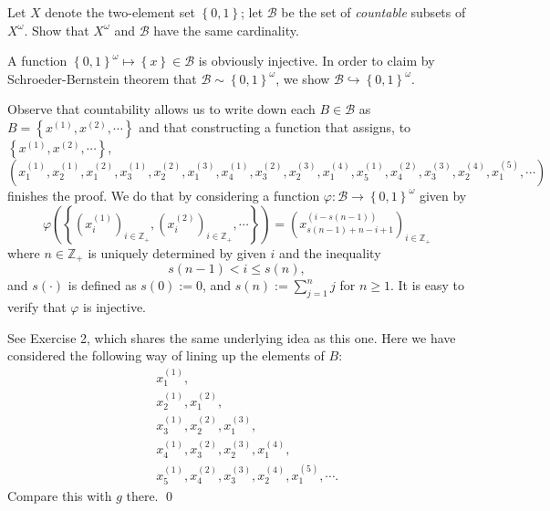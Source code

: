\documentclass[a4paper,12pt]{article}
\begin{document}
\begin{exe}
	Let \( X \) denote the two-element set \( \left\{ 0,1 \right\} \);
	let \( \mathcal{B} \) be the set of \textit{countable} subsets of \( X^{\omega} \).
	Show that \( X^{\omega} \) and \( \mathcal{B} \) have the same cardinality.
\end{exe}\begin{sol}
	A function
	\( \left\{ 0,1 \right\}^{\omega} \mapsto \left\{ x \right\} \in \mathcal{B}\)
	is obviously injective.
	In order to claim by Schroeder-Bernstein theorem that
	\( \mathcal{B} \sim \left\{ 0,1 \right\}^{\omega} \),
	we show \( \mathcal{B} \hookrightarrow \left\{ 0,1 \right\}^{\omega}\). 
	
	Observe that countability allows us to write down each 
	\( B \in \mathcal{B} \) as
	\( B=\left\{ x^{(1)}, x^{(2)},\cdots \right\} \)
	and that constructing a function that assigns, to 
	\( \left\{ x^{(1)}, x^{(2)},\cdots \right\} \),
	\begin{equation*}
		\left(
		x^{(1)}_1,
		x^{(1)}_2,x^{(2)}_1,
		x^{(1)}_3,x^{(2)}_2,x^{(3)}_1,
		x^{(1)}_4,x^{(2)}_3,x^{(3)}_2,x^{(4)}_1,
		x^{(1)}_5,x^{(2)}_4,x^{(3)}_3,x^{(4)}_2,x^{(5)}_1,\cdots
		\right)
	\end{equation*}
	finishes the proof.
	We do that by considering a function
	\( \varphi : \mathcal{B} \to \left\{ 0,1 \right\}^{\omega} \)
	given by
	\begin{equation*}
		\varphi
		\left( \left\{ \left( x^{(1)}_i \right)_{i \in \mathbb{Z}_{+}},
		\left( x^{(2)}_i \right)_{i \in \mathbb{Z}_{+}},\cdots \right\} \right)
		=
		\left( x^{(i - s(n-1))}_{s(n-1)+n-i+1} \right)_{i \in \mathbb{Z}_{+}}
	\end{equation*}
	where \( n \in \mathbb{Z}_{+} \) is uniquely determined by
	given \( i \) and the inequality
	\begin{equation*}
		s(n-1) < i \le s(n),
	\end{equation*}
	and \( s(\cdot) \) is defined as \( s(0):=0 \), and
	\( s(n):=\sum_{j=1}^n j \)
	for \( n \ge 1 \).
	It is easy to verify that \( \varphi \) is injective.
	
	See Exercise 2, which shares the same underlying idea as this one.
	Here we have considered the following way of lining up the elements of \( B \):
	\begin{eqnarray*}
		&&x^{(1)}_1,\\
		&&x^{(1)}_2,x^{(2)}_1,\\
		&&x^{(1)}_3,x^{(2)}_2,x^{(3)}_1,\\
		&&x^{(1)}_4,x^{(2)}_3,x^{(3)}_2,x^{(4)}_1,\\
		&&x^{(1)}_5,x^{(2)}_4,x^{(3)}_3,x^{(4)}_2,x^{(5)}_1,\cdots.
	\end{eqnarray*}
	Compare this with \( g \) there.
	\qed\end{sol}
\end{document}
